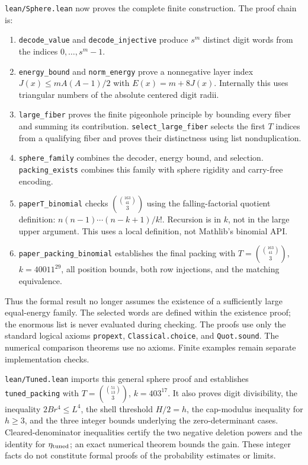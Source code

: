 \documentclass[11pt]{article}
\begin{document}
\texttt{lean/Sphere.lean} now proves the complete finite construction.
The proof chain is:
\begin{enumerate}
\item \texttt{decode\_value} and \texttt{decode\_injective} produce
\(s^m\) distinct digit words from the indices \(0,\ldots,s^m-1\).
\item \texttt{energy\_bound} and \texttt{norm\_energy} prove a
nonnegative layer index \(J(x)\le mA(A-1)/2\) with
\(E(x)=m+8J(x)\). Internally this uses triangular numbers of the
absolute centered digit radii.
\item \texttt{large\_fiber} proves the finite pigeonhole principle
by bounding every fiber and summing its contribution.
\texttt{select\_large\_fiber} selects the first \(T\) indices from
a qualifying fiber and proves their distinctness using list
nonduplication.
\item \texttt{sphere\_family} combines the decoder, energy bound,
and selection. \texttt{packing\_exists} combines this family with
sphere rigidity and carry-free encoding.
\item \texttt{paperT\_binomial} checks
\(\binom{\binom{163}{41}}3\) using the falling-factorial quotient
definition: \(n(n-1)\cdots(n-k+1)/k!\). Recursion is in \(k\), not
in the large upper argument. This uses a local definition, not
Mathlib's binomial API.
\item \texttt{paper\_packing\_binomial} establishes the final
packing with \(T=\binom{\binom{163}{41}}3\), \(k=40011^{29}\),
all position bounds, both row injections, and the matching equivalence.
\end{enumerate}
Thus the formal result no longer assumes the existence of a sufficiently
large equal-energy family. The selected words are defined within the
existence proof; the enormous list is never evaluated during checking.
The proofs use only the standard logical axioms
\texttt{propext}, \texttt{Classical.choice}, and \texttt{Quot.sound}.
The numerical comparison theorems use no axioms.
Finite examples remain separate implementation checks.

\texttt{lean/Tuned.lean} imports this general sphere proof and establishes
\texttt{tuned\_packing} with
\(T=\binom{\binom{51}{13}}3\), \(k=403^{17}\).
It also proves digit divisibility, the inequality \(2Br^4\le L^4\),
the shell threshold \(H/2=h\), the cap-modulus inequality for \(h\ge3\),
and the three integer bounds underlying the zero-determinant cases.
Cleared-denominator inequalities certify the two negative deletion
powers and the identity for \(\eta_{\rm tuned}\); an exact numerical
theorem bounds the gain. These integer facts do not constitute
formal proofs of the probability estimates or limits.
\end{document}
